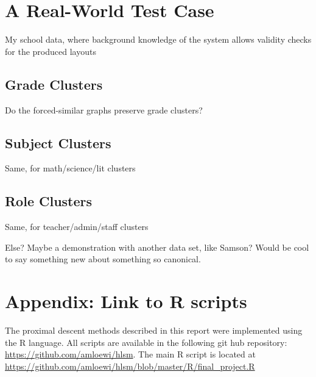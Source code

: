 \documentclass{article}
\begin{document}
\section{A Real-World Test Case}
My school data, where background knowledge of the system allows validity checks for the produced layouts
\subsection{Grade Clusters}
Do the forced-similar graphs preserve grade clusters?
\subsection{Subject Clusters}
Same, for math/science/lit clusters
\subsection{Role Clusters}
Same, for teacher/admin/staff clusters

Else? Maybe a demonstration with another data set, like Samson? Would be cool to say something new about something so canonical.



\clearpage



\section*{Appendix: Link to R scripts}

The proximal descent methods described in this report were implemented using the R language. All scripts are available in the following git hub repository: \url{https://github.com/amloewi/hlsm}. The main R script is located at \url{https://github.com/amloewi/hlsm/blob/master/R/final_project.R}
\end{document}
